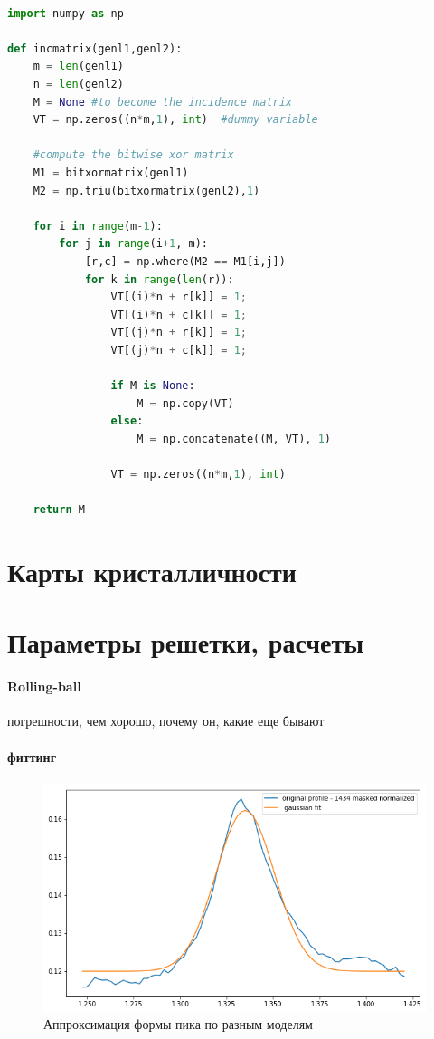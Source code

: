 	
	\begin{lstlisting}[language=Python, caption=Python example, label={lst:ball}]
	
import numpy as np
 
def incmatrix(genl1,genl2):
    m = len(genl1)
    n = len(genl2)
    M = None #to become the incidence matrix
    VT = np.zeros((n*m,1), int)  #dummy variable
 
    #compute the bitwise xor matrix
    M1 = bitxormatrix(genl1)
    M2 = np.triu(bitxormatrix(genl2),1) 
 
    for i in range(m-1):
        for j in range(i+1, m):
            [r,c] = np.where(M2 == M1[i,j])
            for k in range(len(r)):
                VT[(i)*n + r[k]] = 1;
                VT[(i)*n + c[k]] = 1;
                VT[(j)*n + r[k]] = 1;
                VT[(j)*n + c[k]] = 1;
 
                if M is None:
                    M = np.copy(VT)
                else:
                    M = np.concatenate((M, VT), 1)
 
                VT = np.zeros((n*m,1), int)
 
    return M
\end{lstlisting}
	
	\section{Карты кристалличности}
	
	\section{Параметры решетки, расчеты}
	
	
	\paragraph{Rolling-ball}
	погрешности, чем хорошо, почему он, какие еще бывают
	


    \paragraph{фиттинг}

\begin{figure}
    \centering
    \includegraphics[width=\linewidth]{fig/gauss-fit.png}
    \caption{Аппроксимация формы пика по разным моделям}
    \label{fig:my_label}
\end{figure}
	
